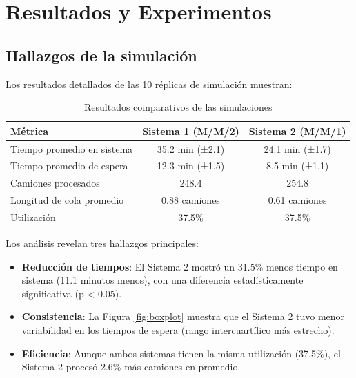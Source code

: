\documentclass[a4paper, 12pt]{article}
\begin{document}
	
  \section{Resultados y Experimentos}
  
  \subsection{Hallazgos de la simulación}
  
  Los resultados detallados de las 10 réplicas de simulación muestran:
  
  \begin{table}[H]
  	\centering
  	\begin{tabular}{lcc}
  		\toprule
  		\textbf{Métrica} & \textbf{Sistema 1 (M/M/2)} & \textbf{Sistema 2 (M/M/1)} \\
  		\midrule
  		Tiempo promedio en sistema & 35.2 min (±2.1) & 24.1 min (±1.7) \\
  		Tiempo promedio de espera & 12.3 min (±1.5) & 8.5 min (±1.1) \\
  		Camiones procesados & 248.4 & 254.8 \\
  		Longitud de cola promedio & 0.88 camiones & 0.61 camiones \\
  		Utilización & 37.5\% & 37.5\% \\
  		\bottomrule
  	\end{tabular}
  	\caption{Resultados comparativos de las simulaciones}
  	\label{tab:resultados}
  \end{table}
  
  Los análisis revelan tres hallazgos principales:
  
  \begin{itemize}
  	\item \textbf{Reducción de tiempos}: El Sistema 2 mostró un 31.5\% menos tiempo en sistema (11.1 minutos menos), con una diferencia estadísticamente significativa (p < 0.05).
  	
  	\item \textbf{Consistencia}: La Figura \ref{fig:boxplot} muestra que el Sistema 2 tuvo menor variabilidad en los tiempos de espera (rango intercuartílico más estrecho).
  	
  	\item \textbf{Eficiencia}: Aunque ambos sistemas tienen la misma utilización (37.5\%), el Sistema 2 procesó 2.6\% más camiones en promedio.
  \end{itemize}
  
\end{document}
